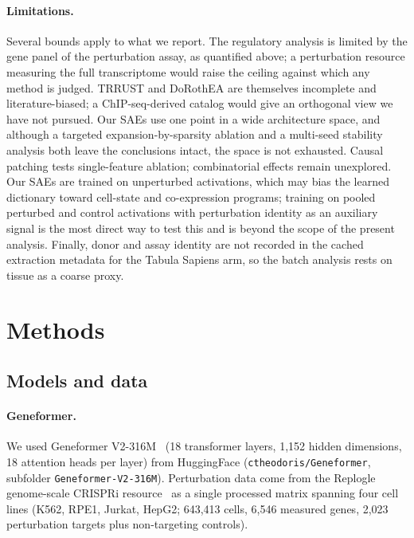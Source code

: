 \documentclass[onecolumn,11pt]{article}
\begin{document}
\paragraph{Limitations.}
Several bounds apply to what we report. The regulatory analysis is limited by the gene panel of the
perturbation assay, as quantified above; a perturbation resource measuring the full transcriptome
would raise the ceiling against which any method is judged. TRRUST and DoRothEA are themselves
incomplete and literature-biased; a ChIP-seq-derived catalog would give an orthogonal view we have
not pursued. Our SAEs use one point in a wide architecture space, and although a targeted
expansion-by-sparsity ablation and a multi-seed stability analysis both leave the conclusions
intact, the space is not exhausted. Causal patching tests single-feature ablation; combinatorial
effects remain unexplored. Our SAEs are trained on unperturbed activations, which may bias the
learned dictionary toward cell-state and co-expression programs; training on pooled perturbed and
control activations with perturbation identity as an auxiliary signal is the most direct way to test
this and is beyond the scope of the present analysis. Finally, donor and assay identity are not
recorded in the cached extraction metadata for the Tabula Sapiens arm, so the batch analysis rests
on tissue as a coarse proxy.

\section{Methods}
\subsection*{Models and data}

\paragraph{Geneformer.} We used Geneformer V2-316M~\cite{theodoris2023transfer} (18 transformer
layers, 1,152 hidden dimensions, 18 attention heads per layer) from HuggingFace
(\texttt{ctheodoris/\allowbreak Geneformer}, subfolder \texttt{Geneformer-V2-316M}). Perturbation
data come from the Replogle genome-scale CRISPRi resource~\cite{replogle2022mapping} as a single
processed matrix spanning four cell lines (K562, RPE1, Jurkat, HepG2; 643,413 cells, 6,546 measured
genes, 2,023 perturbation targets plus non-targeting controls).
\end{document}
